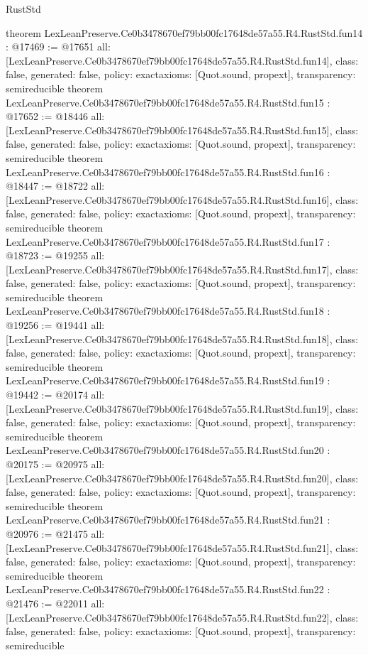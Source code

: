 \begin{lexlean}{RustStd}
\begin{coremodule}
{}
theorem LexLeanPreserve.Ce0b3478670ef79bb00fc17648de57a55.R4.RustStd.fun14 : @17469 := @17651 {
  all: [LexLeanPreserve.Ce0b3478670ef79bb00fc17648de57a55.R4.RustStd.fun14],
  class: false,
  generated: false,
  policy: exact{axioms: [Quot.sound, propext]},
  transparency: semireducible
}
theorem LexLeanPreserve.Ce0b3478670ef79bb00fc17648de57a55.R4.RustStd.fun15 : @17652 := @18446 {
  all: [LexLeanPreserve.Ce0b3478670ef79bb00fc17648de57a55.R4.RustStd.fun15],
  class: false,
  generated: false,
  policy: exact{axioms: [Quot.sound, propext]},
  transparency: semireducible
}
theorem LexLeanPreserve.Ce0b3478670ef79bb00fc17648de57a55.R4.RustStd.fun16 : @18447 := @18722 {
  all: [LexLeanPreserve.Ce0b3478670ef79bb00fc17648de57a55.R4.RustStd.fun16],
  class: false,
  generated: false,
  policy: exact{axioms: [Quot.sound, propext]},
  transparency: semireducible
}
theorem LexLeanPreserve.Ce0b3478670ef79bb00fc17648de57a55.R4.RustStd.fun17 : @18723 := @19255 {
  all: [LexLeanPreserve.Ce0b3478670ef79bb00fc17648de57a55.R4.RustStd.fun17],
  class: false,
  generated: false,
  policy: exact{axioms: [Quot.sound, propext]},
  transparency: semireducible
}
theorem LexLeanPreserve.Ce0b3478670ef79bb00fc17648de57a55.R4.RustStd.fun18 : @19256 := @19441 {
  all: [LexLeanPreserve.Ce0b3478670ef79bb00fc17648de57a55.R4.RustStd.fun18],
  class: false,
  generated: false,
  policy: exact{axioms: [Quot.sound, propext]},
  transparency: semireducible
}
theorem LexLeanPreserve.Ce0b3478670ef79bb00fc17648de57a55.R4.RustStd.fun19 : @19442 := @20174 {
  all: [LexLeanPreserve.Ce0b3478670ef79bb00fc17648de57a55.R4.RustStd.fun19],
  class: false,
  generated: false,
  policy: exact{axioms: [Quot.sound, propext]},
  transparency: semireducible
}
theorem LexLeanPreserve.Ce0b3478670ef79bb00fc17648de57a55.R4.RustStd.fun20 : @20175 := @20975 {
  all: [LexLeanPreserve.Ce0b3478670ef79bb00fc17648de57a55.R4.RustStd.fun20],
  class: false,
  generated: false,
  policy: exact{axioms: [Quot.sound, propext]},
  transparency: semireducible
}
theorem LexLeanPreserve.Ce0b3478670ef79bb00fc17648de57a55.R4.RustStd.fun21 : @20976 := @21475 {
  all: [LexLeanPreserve.Ce0b3478670ef79bb00fc17648de57a55.R4.RustStd.fun21],
  class: false,
  generated: false,
  policy: exact{axioms: [Quot.sound, propext]},
  transparency: semireducible
}
theorem LexLeanPreserve.Ce0b3478670ef79bb00fc17648de57a55.R4.RustStd.fun22 : @21476 := @22011 {
  all: [LexLeanPreserve.Ce0b3478670ef79bb00fc17648de57a55.R4.RustStd.fun22],
  class: false,
  generated: false,
  policy: exact{axioms: [Quot.sound, propext]},
  transparency: semireducible
}
\end{coremodule}
\end{lexlean}
